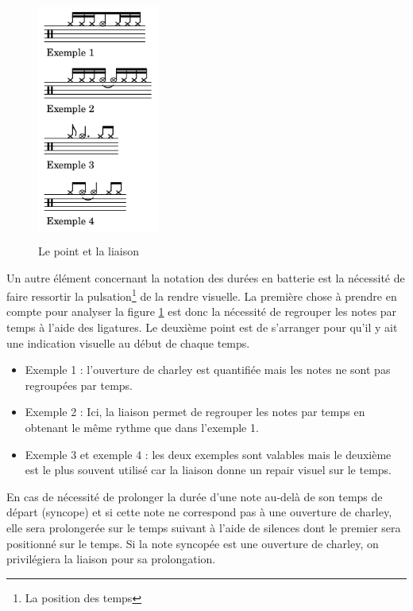 \begin{figure}[h]
	\centering
	\includegraphics[height=80mm, width=40mm]{
    z_images/3_methodes/0_notation_de_la_batterie/3_point_et_liaison.png}
	\caption{Le point et la liaison}
	\label{point_liaison}
\end{figure}

Un autre élément concernant la notation des durées en batterie est la nécessité
de faire ressortir la pulsation\footnote{La position des temps} de la rendre
visuelle. La première chose à prendre en compte pour analyser la figure
\ref{point_liaison} est donc la nécessité de regrouper les notes par temps à
l’aide des ligatures. Le deuxième point est de s’arranger pour qu’il y ait une
indication visuelle au début de chaque temps.

\begin{itemize}
    \item Exemple 1 : l’ouverture de charley est quantifiée mais les notes ne
        sont pas regroupées par temps.
    \item Exemple 2 : Ici, la liaison permet de regrouper les notes par temps
        en obtenant le même rythme que dans l’exemple 1.
    \item Exemple 3 et exemple 4 : les deux exemples sont valables mais le
        deuxième est le plus souvent utilisé car la liaison donne un repair
        visuel sur le temps.\\
\end{itemize}

En cas de nécessité de prolonger la durée d’une note au-delà 
de son temps de départ (syncope) et si cette note ne correspond pas à une
ouverture de charley, elle sera prolongerée sur le temps suivant à l’aide de
silences dont le premier sera positionné sur le temps. Si la note syncopée est
une ouverture de charley, on privilégiera la liaison pour sa prolongation.

